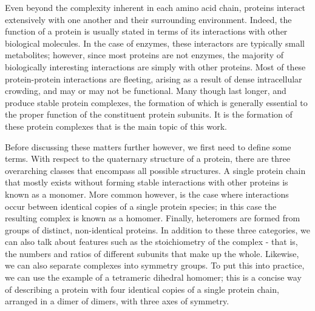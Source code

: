 \documentclass[a4paper,11pt,twoside,openright]{scrbook}
\begin{document}
Even beyond the complexity inherent in each amino acid chain, proteins interact extensively with one another and their surrounding environment. Indeed, the function of a protein is usually stated in terms of its interactions with other biological molecules. In the case of enzymes, these interactors are typically small metabolites; however, since most proteins are not enzymes, the majority of biologically interesting interactions are simply with other proteins. Most of these protein-protein interactions are fleeting, arising as a result of dense intracellular crowding, and may or may not be functional. Many though last longer, and produce stable protein complexes, the formation of which is generally essential to the proper function of the constituent protein subunits. It is the formation of these protein complexes that is the main topic of this work.

Before discussing these matters further however, we first need to define some terms. With respect to the quaternary structure of a protein, there are three overarching classes that encompass all possible structures. A single protein chain that mostly exists without forming stable interactions with other proteins is known as a monomer. More common however, is the case where interactions occur between identical copies of a single protein species; in this case the resulting complex is known as a homomer. Finally, heteromers are formed from groups of distinct, non-identical proteins. In addition to these three categories, we can also talk about features such as the stoichiometry of the complex - that is, the numbers and ratios of different subunits that make up the whole. Likewise, we can also separate complexes into symmetry groups. To put this into practice, we can use the example of a tetrameric dihedral homomer; this is a concise way of describing a protein with four identical copies of a single protein chain, arranged in a dimer of dimers, with three axes of symmetry.

\end{document}
